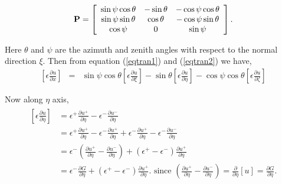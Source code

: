 \begin{align}
    \bf{P}=\left[\begin{array}{ccc}
                 \sin\psi\cos\theta  &-\sin\theta   & -\cos\psi\cos\theta \\
                \sin\psi\sin\theta   & \cos\theta   & -\cos\psi\sin\theta \\
                  \cos\psi 			 & 0 			& \sin\psi
                 \end{array}\right]. \label{eqtran2}
\end{align}

Here $\theta$ and $\psi $ are the azimuth and zenith angles with respect to the normal direction $\xi$.
Then from equation (\ref{eqtran1}) and (\ref{eqtran2}) we have, 
\begin{eqnarray}
	\left[\epsilon \frac{\partial u}{\partial x}\right] &=& \sin \psi \cos \theta \left[\epsilon \frac{\partial u}{\partial \xi}\right]-\sin \theta \left[\epsilon \frac{\partial u}{\partial \eta}\right]-\cos \psi \cos \theta \left[\epsilon \frac{\partial u}{\partial \zeta}\right]\label{3d_gfm1}
\end{eqnarray}

 Now along $\eta$ axis,
\begin{eqnarray}
\begin{aligned}
	\left[\epsilon \frac{\partial u}{\partial \eta}\right] &= \epsilon^+\frac{\partial u^+}{\partial \eta }-\epsilon^-\frac{\partial u^-}{\partial \eta }\\
	&=\epsilon^+\frac{\partial u^+}{\partial \eta }-\epsilon^-\frac{\partial u^+}{\partial \eta }+\epsilon^-\frac{\partial u^+}{\partial \eta }-\epsilon^-\frac{\partial u^-}{\partial \eta }\\
	&= \epsilon^-\left(\frac{\partial u^+}{\partial \eta }-\frac{\partial u^-}{\partial \eta }\right)+(\epsilon^+-\epsilon^-)\frac{\partial u^+}{\partial \eta}\\
	&= \epsilon^-\frac{\partial G}{\partial \eta}+(\epsilon^+-\epsilon^-)\frac{\partial u^+}{\partial \eta}\text{. since } \left(\frac{\partial u^+}{\partial \eta }-\frac{\partial u^-}{\partial \eta }\right)=\frac{\partial}{\partial\eta}[u]=\frac{\partial G}{\partial \eta}.\label{3d_gfm2}
\end{aligned}
\end{eqnarray}
    
